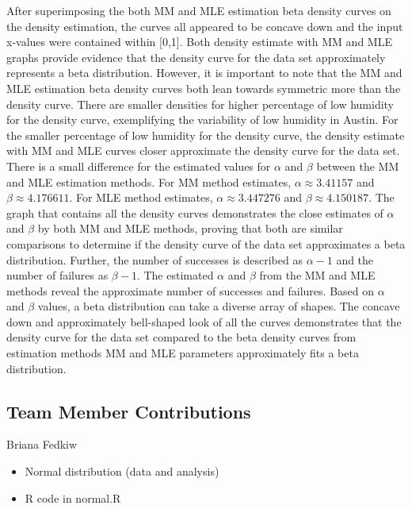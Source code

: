 \documentclass[12pt, letterpaper]{article}
\begin{document}
\normalsize After superimposing the both MM and MLE estimation beta density curves on the density estimation, the curves all appeared to be concave down and the input x-values were contained within [0,1]. Both density estimate with MM and MLE graphs provide evidence that the density curve for the data set approximately represents a beta distribution. However, it is important to note that the MM and MLE estimation beta density curves both lean towards symmetric more than the density curve. There are smaller densities for higher percentage of low humidity for the density curve, exemplifying the variability of low humidity in Austin. For the smaller percentage of low humidity for the density curve, the density estimate with MM and MLE curves closer approximate the density curve for the data set. There is a small difference for the estimated values for ${\alpha}$ and ${\beta}$ between the MM and MLE estimation methods. For MM method estimates, ${\alpha \approx} 3.41157$ and ${\beta \approx} 4.176611$. For MLE method estimates, ${\alpha \approx} 3.447276$ and ${\beta \approx} 4.150187$. The graph that contains all the density curves demonstrates the close estimates of ${\alpha}$ and ${\beta}$ by both MM and MLE methods, proving that both are similar comparisons to determine if the density curve of the data set approximates a beta distribution. Further, the number of successes is described as ${\alpha -1}$ and the number of failures as ${\beta - 1}$. The estimated ${\alpha}$ and ${\beta}$ from the MM and MLE methods reveal the approximate number of successes and failures. Based on ${\alpha}$ and ${\beta}$ values, a beta distribution can take a diverse array of shapes. The concave down and approximately bell-shaped look of all the curves demonstrates that the density curve for the data set compared to the beta density curves from estimation methods MM and MLE parameters approximately fits a beta distribution.\\ 

\newpage
\begin{center}
    \section*{Team Member Contributions}
\end{center}

\normalsize
Briana Fedkiw
\begin{itemize}[leftmargin=50pt]
  \item Normal distribution (data and analysis)
  \item R code in normal.R
\end{itemize}
\end{document}
